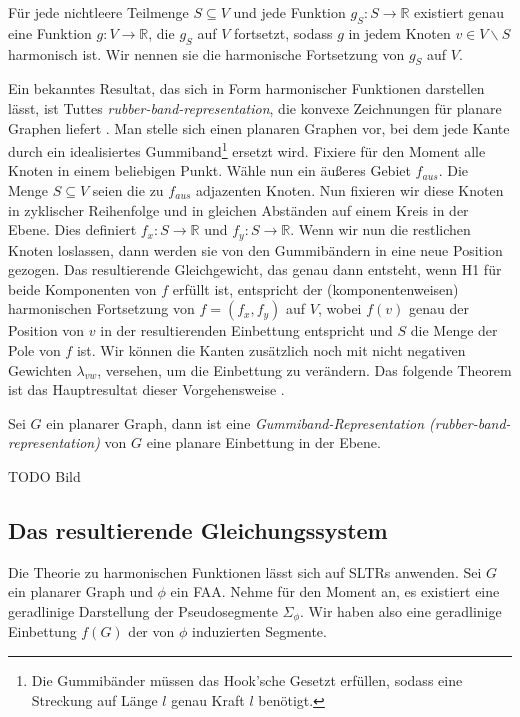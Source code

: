 \begin{theorem}\cite[Theorem 3.1.2]{lov99}\label{harmonic_uni}
Für jede nichtleere Teilmenge $S \subseteq V$ und jede Funktion $g_S:S\to\mathbb{R}$ existiert genau eine Funktion $g:V\to\mathbb{R}$, die $g_S$ auf $V$ fortsetzt, sodass $g$ in jedem Knoten $v\in V \backslash S$ harmonisch ist. Wir nennen sie die harmonische Fortsetzung von $g_S$ auf $V$.
\end{theorem}

Ein bekanntes Resultat, das sich in Form harmonischer Funktionen darstellen lässt, ist Tuttes \textit{rubber-band-representation}, die konvexe Zeichnungen für planare Graphen liefert \cite{tutte63}. Man stelle sich einen planaren Graphen vor, bei dem jede Kante durch ein idealisiertes Gummiband\footnote{Die Gummibänder müssen das Hook'sche Gesetzt erfüllen, sodass eine Streckung auf Länge $l$ genau Kraft $l$ benötigt.} ersetzt wird. Fixiere für den Moment alle Knoten in einem beliebigen Punkt. Wähle nun ein äußeres Gebiet $f_{aus}$. Die Menge $S\subseteq V$ seien die zu $f_{aus}$ adjazenten Knoten. Nun fixieren wir diese Knoten in zyklischer Reihenfolge und in gleichen Abständen auf einem Kreis in der Ebene. Dies definiert $f_x:S \to \mathbb{R}$ und  $f_y:S \to \mathbb{R}$. Wenn wir nun die restlichen Knoten loslassen, dann werden sie von den Gummibändern in eine neue Position gezogen. Das resultierende Gleichgewicht, das genau dann entsteht, wenn H1 für beide Komponenten von $f$ erfüllt ist, entspricht der (komponentenweisen) harmonischen Fortsetzung von $f=(f_x,f_y)$  auf $V$, wobei $f(v)$ genau der Position von $v$ in der resultierenden Einbettung entspricht und $S$ die Menge der Pole von $f$ ist. Wir können die Kanten zusätzlich noch mit nicht negativen Gewichten $\lambda_{vw}$, versehen, um die Einbettung zu verändern. Das folgende Theorem ist das Hauptresultat dieser Vorgehensweise \cite{tutte63}.

\begin{theorem}\label{theo_rubber}
Sei $G$ ein planarer Graph, dann ist eine \textit{Gummiband-Representation (rubber-band-representation)} von $G$ eine planare Einbettung in der Ebene.
\end{theorem}

TODO Bild

\subsection{Das resultierende Gleichungssystem}\label{the_equations}

Die Theorie zu harmonischen Funktionen lässt sich auf SLTRs anwenden. Sei $G$ ein planarer Graph und $\phi$ ein FAA. Nehme für den Moment an, es existiert eine geradlinige Darstellung der Pseudosegmente $\Sigma_{\phi}$. Wir haben also eine geradlinige Einbettung $f(G)$ der von $\phi$ induzierten Segmente. 

